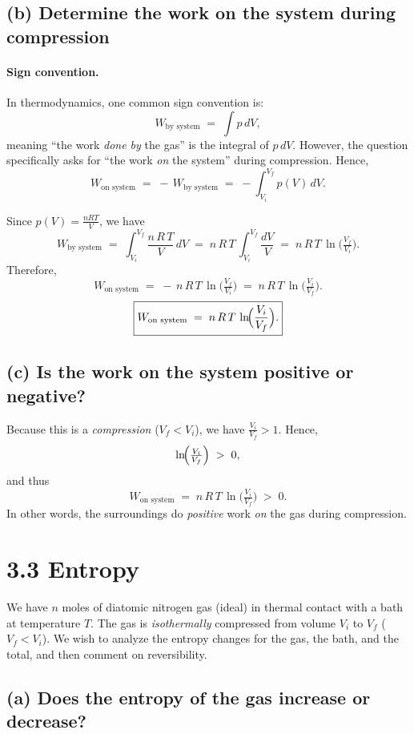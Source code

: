 \documentclass[12pt]{article}
\theoremstyle{definition} %
\theoremstyle{plain} %
\begin{document}
\subsection*{(b) Determine the work on the system during compression}

\paragraph{Sign convention.}
In thermodynamics, one common sign convention is:
\[
W_{\text{by system}} \;=\; \int p\,dV,
\]
meaning ``the work \emph{done by} the gas'' is the integral of $p\,dV$.  
However, the question specifically asks for ``the work \emph{on} the system'' during compression.  
Hence,
\[
W_{\text{on system}} \;=\; -\,W_{\text{by system}}
\;=\;
- \int_{V_i}^{V_f} p(V)\,dV.
\]

Since $p(V) = \frac{nRT}{V}$, we have
\[
W_{\text{by system}}
\;=\;
\int_{V_i}^{V_f} \frac{n\,R\,T}{V}\,dV
\;=\;
n\,R\,T \,\int_{V_i}^{V_f} \frac{dV}{V}
\;=\;
n\,R\,T\,\ln\!\bigl(\tfrac{V_f}{V_i}\bigr).
\]
Therefore,
\[
W_{\text{on system}}
\;=\;
-\,n\,R\,T\,\ln\!\bigl(\tfrac{V_f}{V_i}\bigr)
\;=\;
n\,R\,T\,\ln\!\bigl(\tfrac{V_i}{V_f}\bigr).
\]
\[
\boxed{
W_{\text{on system}}
\;=\;
n\,R\,T\,\ln\!\Bigl(\frac{V_i}{V_f}\Bigr).
}
\]

\subsection*{(c) Is the work on the system positive or negative?}

Because this is a \emph{compression} ($V_f < V_i$), we have $\frac{V_i}{V_f} > 1$. Hence,
\[
\ln\!\Bigl(\tfrac{V_i}{V_f}\Bigr) \;>\; 0,
\]
and thus
\[
W_{\text{on system}} \;=\; n\,R\,T\,\ln\!\bigl(\tfrac{V_i}{V_f}\bigr)
\;>\;
0.
\]
In other words, the surroundings do \emph{positive} work \emph{on} the gas during compression.

\section*{3.3 Entropy}

We have $n$ moles of diatomic nitrogen gas (ideal) in thermal contact with a bath at temperature $T$. 
The gas is \emph{isothermally} compressed from volume $V_i$ to $V_f$ ($V_f < V_i$). 
We wish to analyze the entropy changes for the gas, the bath, and the total, and then comment on reversibility.

\subsection*{(a) Does the entropy of the gas increase or decrease?}
\end{document}
